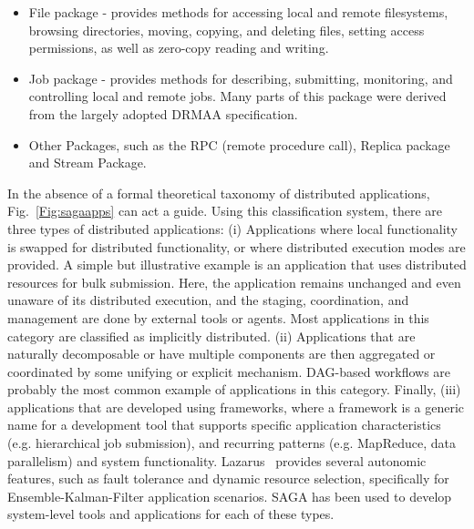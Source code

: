 \documentclass[conference,final]{IEEEtran}
\begin{document}
\begin{itemize}
\item File package - provides methods for accessing local and remote
 filesystems, browsing directories, moving, copying, and deleting
 files, setting access permissions, as well as zero-copy reading and
 writing.
\item Job package - provides methods for describing, submitting,
 monitoring, and controlling local and remote jobs. Many parts of
 this package were derived from the largely adopted
 DRMAA specification. 
\item Other Packages, such as the RPC (remote procedure call), Replica
  package and Stream Package.  
\end{itemize}

In the absence of a formal theoretical taxonomy of distributed
applications, Fig.~\ref{Fig:sagaapps} can act a guide.  Using this
classification system, there are three types of distributed
applications: (i) Applications where local functionality is swapped
for distributed functionality, or where distributed execution modes
are provided.  A simple but illustrative example is %
an application that uses distributed resources for bulk
submission. Here, the application remains unchanged and even unaware
of its distributed execution, and the staging, coordination, and
management are done by external tools or agents. Most applications in
this category are classified as implicitly distributed.  (ii)
Applications that are naturally decomposable or have multiple
components are then aggregated or coordinated by some unifying or
explicit mechanism.  DAG-based workflows are probably the most common
example of applications in this category.  Finally, (iii) applications
that are developed using frameworks, where a framework is a generic
name for a development tool that supports specific application
characteristics (e.g. hierarchical job submission), and recurring
patterns (e.g. MapReduce, data parallelism) and system functionality.
Lazarus~\cite{enkf-gmac09} provides several autonomic features, such as
fault tolerance and dynamic resource selection, specifically for 
Ensemble-Kalman-Filter application scenarios.
SAGA has been used to develop system-level tools and applications for
each of these types.
\end{document}
